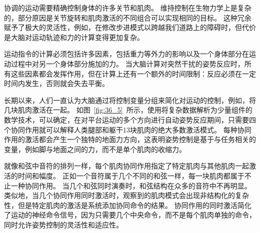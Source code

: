\begin{proposition}[肌肉的协同激活] \label{box:36_2}
	
	\quad \quad 协调的运动需要精确控制身体的许多关节和肌肉。
	维持控制在生物力学上是复杂的，部分原因是关节旋转和肌肉激活的不同组合可以实现相同的目标。
	这种冗余赋予了极大的灵活性，例如，在修改步进模式以跨越我们道路上的障碍时，但代价是大脑对运动轨迹和力的计算变得更加复杂。
	
	\quad \quad 运动指令的计算必须包括许多因素，包括重力等外力的影响以及一个身体部分在运动过程中对另一个身体部分施加的力。
	当大脑计算对突然干扰的姿势反应时，所有这些因素都会发挥作用，但在计算上还有一个额外的时间限制：反应必须在一定时间内发生，否则就会失去平衡。
	
	\quad \quad 长期以来，人们一直认为大脑通过将控制变量分组来简化对运动的控制，例如，将几块肌肉激活在一起。
	如图~\ref{fig:36_5}~所示，使用将复杂数据解析为少量组件的数学技术，可以确定，在对平台运动的多个方向进行自动姿势反应期间，只需要四个协同作用就可以解释人类腿部和躯干13块肌肉的绝大多数激活模式。
	每种协同作用的激活都会产生一个独特的地面力方向，这表明姿势控制是基于与任务相关的变量，例如脚与地面之间的力，而不是单个肌肉的收缩力。
	
	\quad \quad 就像和弦中音符的排列一样，每个肌肉协同作用指定了特定肌肉与其他肌肉一起激活的时间和幅度。
	正如一个音符属于几个不同的和弦一样，每一块肌肉都属于不止一种协同作用。
	当几个和弦同时演奏时，和弦结构在众多的音符中不再明显。
	类似地，当几个协同作用同时激活时，观察到的肌肉模式会出现非结构化的复杂性，但是特定肌肉的激活是系统添加协同命令的结果。
	协同作用的同时激活简化了运动的神经命令信号，因为只需要几个中央命令，而不是每个肌肉单独的命令，同时允许姿势控制的灵活性和适应性。
	
\end{proposition}


